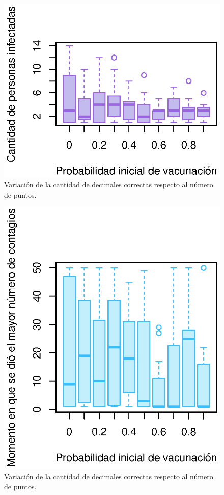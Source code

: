 \documentclass{article}
\begin{document}
\begin{figure}[ht!] %
    \centering
    \includegraphics[width=150mm]{infectados.eps} %
    \caption{Variaci\'on de la cantidad de decimales correctas respecto al n\'umero de puntos.}
    \label{Figura 1}
\end{figure}


\begin{figure}[ht!] %
    \centering
    \includegraphics[width=150mm]{tiempo.eps} %
    \caption{Variaci\'on de la cantidad de decimales correctas respecto al n\'umero de puntos.}
    \label{Figura 2}
\end{figure}
\end{document}
